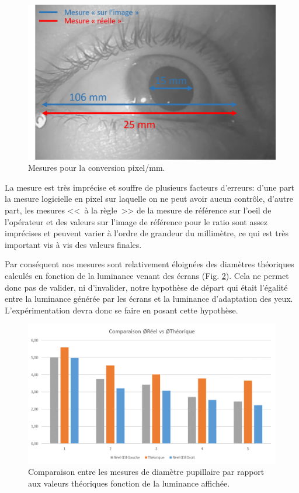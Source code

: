 	\begin{figure}
		\centering
		\includegraphics[scale=.7]{Figures/MesureReferenceOeil}
		\caption{Mesures pour la conversion pixel/mm.}
		\label{fig:mesure_reference}
	\end{figure}
	
	\par La mesure est très imprécise et souffre de plusieurs facteurs d'erreurs: d'une part la mesure logicielle en pixel sur laquelle on ne peut avoir aucun contrôle, d'autre part, les mesures <<~à la règle~>> de la mesure de référence sur l'oeil de l'opérateur et des valeurs sur l'image de référence pour le ratio sont assez imprécises et peuvent varier à l'ordre de grandeur du millimètre, ce qui est très important vis à vis des valeurs finales.
	
	\par Par conséquent nos mesures sont relativement éloignées des diamètres théoriques calculés en fonction de la luminance venant des écrans (Fig. \ref{fig:resultats_mesure_pupille}). Cela ne permet donc pas de valider, ni d'invalider, notre hypothèse de départ qui était l'égalité entre la luminance générée par les écrans et la luminance d'adaptation des yeux. L'expérimentation devra donc se faire en posant cette hypothèse.
	
	\begin{figure}
		\centering
		\includegraphics[scale=.75]{Figures/ComparaisonDiamReelDiamTheo}
		\caption{Comparaison entre les mesures de diamètre pupillaire par rapport aux valeurs théoriques fonction de la luminance affichée.}
		\label{fig:resultats_mesure_pupille}
	\end{figure}
	
